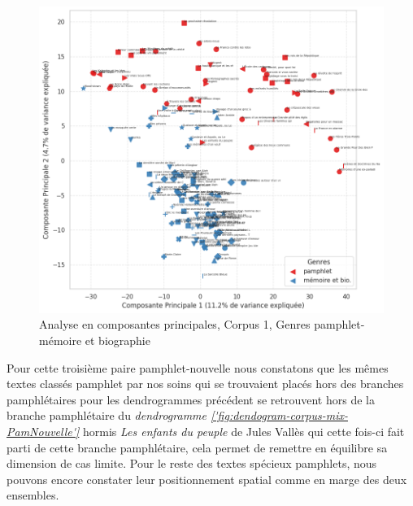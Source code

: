 \begin{figure}[H]
\centering %
\includegraphics[width=1\textwidth]{img/ACP-corpus-mix-PamMem.png}
\caption{Analyse en composantes principales, Corpus 1, Genres pamphlet-mémoire et biographie}
\label{'fig:ACP-corpus-mix-PamMem'}
\end{figure}


Pour cette troisième paire pamphlet-nouvelle nous constatons que les mêmes textes classés pamphlet par nos soins qui se trouvaient placés hors des branches pamphlétaires pour les dendrogrammes précédent se retrouvent hors de la branche pamphlétaire du \textit{dendrogramme \ref{'fig:dendogram-corpus-mix-PamNouvelle'}} hormis \textit{Les enfants du peuple} de Jules Vallès qui cette fois-ci fait parti de cette branche pamphlétaire, cela permet de remettre en équilibre sa dimension de cas limite. Pour le reste des textes spécieux pamphlets, nous pouvons encore constater leur positionnement spatial comme en marge des deux ensembles.

